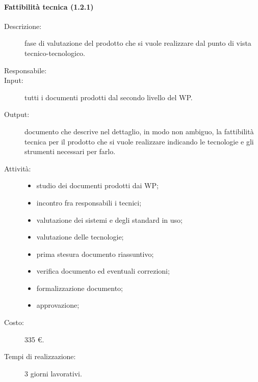 \paragraph{Fattibilità tecnica (1.2.1)}
\begin{description}
\item[Descrizione:] fase di valutazione del prodotto che si vuole realizzare dal punto di vista tecnico-tecnologico.
\item[Responsabile:] 
\item[Input:] tutti i documenti prodotti dal secondo livello del WP.
\item[Output:] documento che descrive nel dettaglio, in modo non ambiguo, la fattibilità tecnica per il prodotto che si vuole realizzare indicando le tecnologie e gli strumenti necessari per farlo.
\item[Attività:] 
\begin{center}
\begin{itemize}
\item studio dei documenti prodotti dai WP;
\item incontro fra responsabili i tecnici;
\item valutazione dei sistemi e degli standard in uso;
\item valutazione delle tecnologie;
\item prima stesura documento riassuntivo;
\item verifica documento ed eventuali correzioni;
\item formalizzazione documento;
\item approvazione;
\end{itemize}
\end{center}
\item[Costo:] 335 \euro{}.
\item[Tempi di realizzazione:] 3 giorni lavorativi.
\end{description}

